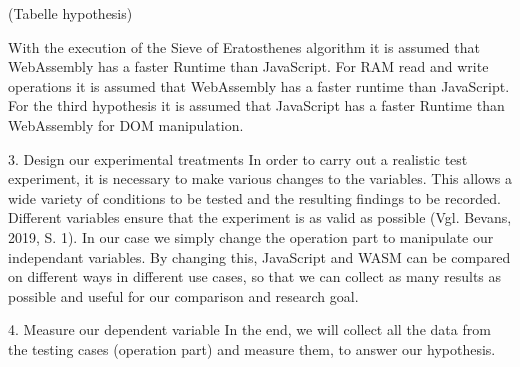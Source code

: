 (Tabelle hypothesis)

With the execution of the Sieve of Eratosthenes algorithm it is assumed that WebAssembly has a faster Runtime than JavaScript.
For RAM read and write operations it is assumed that WebAssembly has a faster runtime than JavaScript.
For the third hypothesis it is assumed that JavaScript has a faster Runtime than WebAssembly for DOM manipulation.

3.	Design our experimental treatments
In order to carry out a realistic test experiment, it is necessary to make various changes to the variables. This allows a wide variety of conditions to be tested and the resulting findings to be recorded. Different variables ensure that the experiment is as valid as possible (Vgl. Bevans, 2019, S. 1).
In our case we simply change the operation part to manipulate our independant variables. By changing this, JavaScript and WASM can be compared on different ways in different use cases, so that we can collect as many results as possible and useful for our comparison and research goal.

4.	Measure our dependent variable
In the end, we will collect all the data from the testing cases (operation part) and measure them, to answer our hypothesis.
